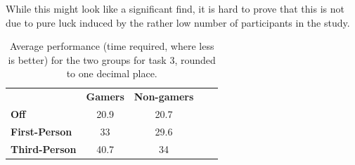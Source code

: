 \documentclass[runningheads,a4paper,oribibl]{llncs}
\begin{document}
While this might look like a significant find, it is hard to prove that this is not due to pure luck induced by the rather low number of participants in the study.





\begin{table}[]
\centering
\label{tab:Task3GraphP}
\setlength{\tabcolsep}{1em}
\def\arraystretch{1.8}
\begin{tabular}{l|c|cll}
                      & {\textbf{Gamers}} & {\textbf{Non-gamers}} &  &  \\ \cline{1-3}
\textbf{Off}          & 20.9                                    & 20.7                                          &  &  \\ \cline{1-3}
\textbf{First-Person} & 33                                   & 29.6                                        &  &  \\ \cline{1-3}
\textbf{Third-Person} & 40.7                                    & 34                                        &  & 
\end{tabular}
\caption{Average performance (time required, where less is better) for the two groups for task 3, rounded to one decimal place.}
\end{table}


\end{document}
